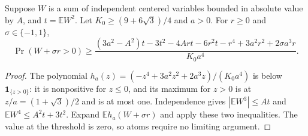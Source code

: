 \begin{lemma}\label{shortloc:quartic}
Suppose $W$ is a sum of independent centered variables bounded in absolute
value by $A$, and $t=\mathbb E W^2$. Let $K_0\ge(9+6\sqrt3)/4$ and $a>0$.
For $r\ge0$ and $\sigma\in\{-1,1\}$,
\begin{equation}\label{shortloc:quarticformula}
 \Pr(W+\sigma r>0)\ge
 \frac{(3a^2-A^2)t-3t^2-4Art-6r^2t-r^4
                      +3a^2r^2+2\sigma a^3r}{K_0a^4}.
\end{equation}
\end{lemma}
\begin{proof}
The polynomial $h_a(z)=(-z^4+3a^2z^2+2a^3z)/(K_0a^4)$ is below
$\mathbf1_{\{z>0\}}$: it is nonpositive for $z\le0$, and its maximum for
$z>0$ is at $z/a=(1+\sqrt3)/2$ and is at most one. Independence gives
$|\mathbb E W^3|\le At$ and $\mathbb E W^4\le A^2t+3t^2$.
Expand $\mathbb Eh_a(W+\sigma r)$ and apply these two inequalities.
The value at the threshold is zero, so atoms require no limiting argument.
\end{proof}

